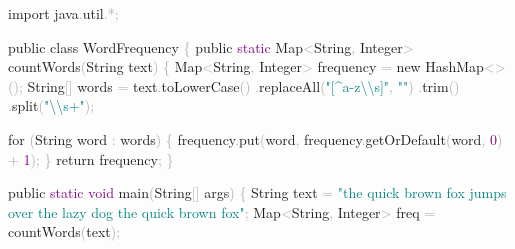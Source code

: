 \documentclass[
  justified,
  openright,
]{tufte-book}
\newcommand{\BuiltInTok}[1]{#1}
\newcommand{\ControlFlowTok}[1]{\textcolor{BrandBlue}{#1}}
\newcommand{\DataTypeTok}[1]{\textcolor{Purple}{#1}}
\newcommand{\DecValTok}[1]{\textcolor{Purple}{#1}}
\newcommand{\FunctionTok}[1]{\textcolor{BrandBlue}{#1}}
\newcommand{\ImportTok}[1]{\textcolor{BrandAccent}{#1}}
\newcommand{\KeywordTok}[1]{\textcolor{BrandBlue}{#1}}
\newcommand{\NormalTok}[1]{#1}
\newcommand{\OperatorTok}[1]{\textcolor{DarkGray}{#1}}
\newcommand{\SpecialCharTok}[1]{\textcolor{Teal}{#1}}
\newcommand{\StringTok}[1]{\textcolor{Teal}{#1}}
\newenvironment{Shaded}{%
  \begin{snugshade}
}{%
  \end{snugshade}
}
\begin{document}
\begin{Shaded}
\begin{Highlighting}[]
\KeywordTok{import} \ImportTok{java}\OperatorTok{.}\ImportTok{util}\OperatorTok{.*;}

\KeywordTok{public} \KeywordTok{class}\NormalTok{ WordFrequency }\OperatorTok{\{}
    \KeywordTok{public} \DataTypeTok{static} \BuiltInTok{Map}\OperatorTok{\textless{}}\BuiltInTok{String}\OperatorTok{,} \BuiltInTok{Integer}\OperatorTok{\textgreater{}} \FunctionTok{countWords}\OperatorTok{(}\BuiltInTok{String}\NormalTok{ text}\OperatorTok{)} \OperatorTok{\{}
        \BuiltInTok{Map}\OperatorTok{\textless{}}\BuiltInTok{String}\OperatorTok{,} \BuiltInTok{Integer}\OperatorTok{\textgreater{}}\NormalTok{ frequency }\OperatorTok{=} \KeywordTok{new} \BuiltInTok{HashMap}\OperatorTok{\textless{}\textgreater{}();}
        \BuiltInTok{String}\OperatorTok{[]}\NormalTok{ words }\OperatorTok{=}\NormalTok{ text}\OperatorTok{.}\FunctionTok{toLowerCase}\OperatorTok{()}
                             \OperatorTok{.}\FunctionTok{replaceAll}\OperatorTok{(}\StringTok{"[\^{}a{-}z}\SpecialCharTok{\textbackslash{}\textbackslash{}}\StringTok{s]"}\OperatorTok{,} \StringTok{""}\OperatorTok{)}
                             \OperatorTok{.}\FunctionTok{trim}\OperatorTok{()}
                             \OperatorTok{.}\FunctionTok{split}\OperatorTok{(}\StringTok{"}\SpecialCharTok{\textbackslash{}\textbackslash{}}\StringTok{s+"}\OperatorTok{);}

        \ControlFlowTok{for} \OperatorTok{(}\BuiltInTok{String}\NormalTok{ word }\OperatorTok{:}\NormalTok{ words}\OperatorTok{)} \OperatorTok{\{}
\NormalTok{            frequency}\OperatorTok{.}\FunctionTok{put}\OperatorTok{(}\NormalTok{word}\OperatorTok{,}\NormalTok{ frequency}\OperatorTok{.}\FunctionTok{getOrDefault}\OperatorTok{(}\NormalTok{word}\OperatorTok{,} \DecValTok{0}\OperatorTok{)} \OperatorTok{+} \DecValTok{1}\OperatorTok{);}
        \OperatorTok{\}}
        \ControlFlowTok{return}\NormalTok{ frequency}\OperatorTok{;}
    \OperatorTok{\}}

    \KeywordTok{public} \DataTypeTok{static} \DataTypeTok{void} \FunctionTok{main}\OperatorTok{(}\BuiltInTok{String}\OperatorTok{[]}\NormalTok{ args}\OperatorTok{)} \OperatorTok{\{}
        \BuiltInTok{String}\NormalTok{ text }\OperatorTok{=} \StringTok{"the quick brown fox jumps over the lazy dog the quick brown fox"}\OperatorTok{;}
        \BuiltInTok{Map}\OperatorTok{\textless{}}\BuiltInTok{String}\OperatorTok{,} \BuiltInTok{Integer}\OperatorTok{\textgreater{}}\NormalTok{ freq }\OperatorTok{=} \FunctionTok{countWords}\OperatorTok{(}\NormalTok{text}\OperatorTok{);}


\end{Highlighting}
\end{Shaded}
\end{document}
